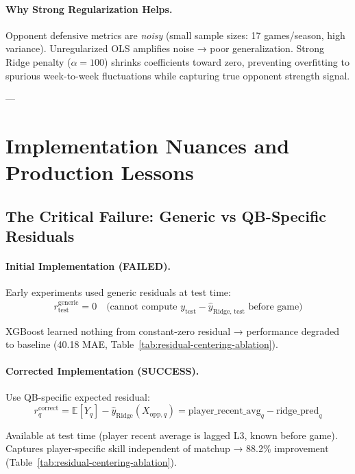 \paragraph{Why Strong Regularization Helps.}
Opponent defensive metrics are \emph{noisy} (small sample sizes: 17 games/season, high variance). Unregularized OLS amplifies noise → poor generalization. Strong Ridge penalty ($\alpha = 100$) shrinks coefficients toward zero, preventing overfitting to spurious week-to-week fluctuations while capturing true opponent strength signal.

---

\section{Implementation Nuances and Production Lessons}
\label{sec:implementation}

\subsection{The Critical Failure: Generic vs QB-Specific Residuals}

\paragraph{Initial Implementation (FAILED).}
Early experiments used generic residuals at test time:
\begin{equation}
r_{\text{test}}^{\text{generic}} = 0 \quad \text{(cannot compute } y_{\text{test}} - \hat{y}_{\text{Ridge, test}} \text{ before game)}
\end{equation}

XGBoost learned nothing from constant-zero residual → performance degraded to baseline (40.18 MAE, Table~\ref{tab:residual-centering-ablation}).

\paragraph{Corrected Implementation (SUCCESS).}
Use QB-specific expected residual:
\begin{equation}
r_q^{\text{correct}} = \mathbb{E}[Y_q] - \hat{y}_{\text{Ridge}}(X_{\text{opp}, q}) = \text{player\_recent\_avg}_q - \text{ridge\_pred}_q
\end{equation}

Available at test time (player recent average is lagged L3, known before game). Captures player-specific skill independent of matchup → 88.2\% improvement (Table~\ref{tab:residual-centering-ablation}).

